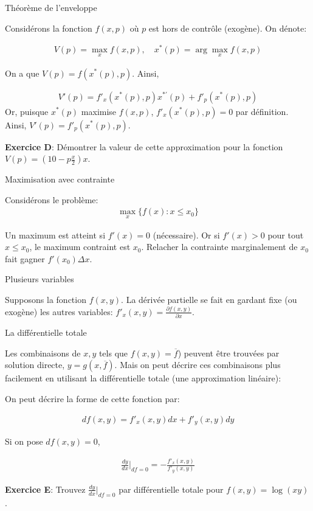 \documentclass[handout]{beamer}
\begin{document}
\begin{frame}{Théorème de l'enveloppe}

Considérons la fonction $f(x,p)$ où $p$ est hors de contrôle (exogène). On dénote:

\begin{eqnarray*}
 V(p) = \max_x f(x,p) , \quad x^*(p) = \arg \max_x f(x,p)
\end{eqnarray*}

On a que $V(p) = f(x^*(p),p)$. Ainsi, 

\begin{eqnarray}
V'(p) = f'_x(x^*(p),p)x^{*'}(p) + f'_p(x^*(p),p)
\end{eqnarray}
Or, puisque $x^*(p)$ maximise $f(x,p)$, $f'_x(x^*(p),p) = 0$ par définition. Ainsi, $V'(p) = f'_p(x^*(p),p)$.  

\textbf{Exercice D}: Démontrer la valeur de cette approximation pour la fonction $V(p) = (10 - p\frac{x}{2})x$. 
\end{frame}

\begin{frame}{Maximisation avec contrainte}

Considérons le problème: 
\begin{eqnarray*}
	\max_x \{f(x):x \leq x_0\}
\end{eqnarray*}

Un maximum est atteint si $f'(x)=0$ (nécessaire). Or si $f'(x)>0 $ pour tout $ x \leq x_0$, le maximum contraint est $x_0$. Relacher la contrainte marginalement de $x_0$ fait gagner $f'(x_0)\Delta x$.  


\end{frame}

\begin{frame}{Plusieurs variables}

Supposons la fonction $f(x,y)$. La dérivée partielle se fait en gardant fixe (ou exogène) les autres variables: $f'_x(x,y) = \frac{\partial f(x,y)}{\partial x}$.

\end{frame}

\begin{frame}{La différentielle totale}

Les combinaisons de $x,y$ tels que $f(x,y) = \overline{f}$) peuvent être trouvées par solution directe, $y=g(x,\overline{f})$. Mais on peut décrire ces combinaisons plus facilement en utilisant la différentielle totale (une approximation linéaire): 

On peut décrire la forme de cette fonction par: 

\begin{eqnarray*}
df(x,y) = f'_x(x,y)dx + f'_y(x,y)dy
\end{eqnarray*}

Si on pose $df(x,y)=0$, 

\begin{eqnarray*}
\frac{dy}{dx}\Bigr|_{df=0} = -\frac{f'_x(x,y)}{f'_y(x,y)}
\end{eqnarray*}
 
\textbf{Exercice E}: Trouvez $\frac{dy}{dx}\Bigr|_{df=0}$ par différentielle totale pour $f(x,y)=\log(xy)$. 
\end{frame}
\end{document}
